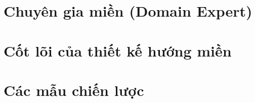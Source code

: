\section{Chuyên gia  miền    (Domain Expert)}


\section{Cốt lõi của thiết kế hướng miền}











\section{Các mẫu chiến lược}

